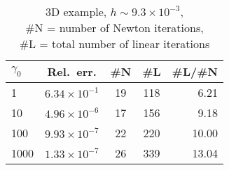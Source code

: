 \documentclass[12pt]{article}
\begin{document}
\begin{table}
\begin{tabular}{lcccr}\toprule 
   $\gamma_0$ & Rel.~err. & \#N & \#L & \#L/\#N\\
   \midrule 
   1 & $6.34 \times 10^{-1}$ &19 & 118 & 6.21 \\
   10 & $4.96\times 10^{-6}$ & 17 & 156 & 9.18\\
   100 & $9.93\times 10^{-7}$ & 22 & 220 &10.00 \\
1000 & $1.33\times 10^{-7}$ & 26 & 339& 13.04\\
   \bottomrule
\end{tabular}
\caption{3D example, $h \sim 9.3 \times 10^{-3}$, \\
\#N = number of Newton iterations, \\
\#L = total number of linear iterations}
\end{table}
\end{document}
